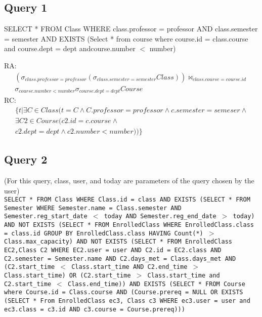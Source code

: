 \documentclass[11pt,oneside,a4paper]{article}
\begin{document}
\subsection{Query 1}
 SELECT * FROM Class WHERE class.professor = professor AND class.semester =
 semester AND EXISTS (Select * from course where course.id = class.course and
 course.dept = dept andcourse.number $<$ number) 

RA: 
\begin{align*}(\sigma_{class.professor = professor} (\sigma_{class.semester = semester}
Class)) \bowtie_{class.course = course.id} \\
\sigma_{course.number < number}
\sigma_{course.dept = dept} Course 
\end{align*}
RC: 
\begin{align*} \{t | \exists C \in Class ( t = C \wedge C.professor = professor \wedge
c.semester = semeser \wedge \\
\exists C2 \in Course ( c2.id = c.course \wedge \\
c2.dept = dept \wedge c2.number < number))\}\end{align*}

\subsection{Query 2}
(For this query, class, user, and today are parameters of the query chosen by
the user) \\

\texttt{SELECT * FROM Class WHERE Class.id = class AND EXISTS (SELECT * FROM
Semester WHERE Semester.name = Class.semester AND Semester.reg\_start\_date $<$
today AND Semester.reg\_end\_date $>$ today) AND NOT EXISTS (SELECT * FROM
EnrolledClass WHERE EnrolledClass.class = class.id GROUP BY EnrolledClass.class
HAVING Count(*) $>$ Class.max\_capacity) AND NOT EXISTS (SELECT * FROM
EnrolledClass EC2,Class C2 WHERE EC2.user = user AND C2.id = EC2.class AND
C2.semester = Semester.name AND C2.days\_met = Class.days\_met AND
(C2.start\_time $<$ Class.start\_time AND C2.end\_time $>$ Class.start\_time)
OR (C2.start\_time $>$ Class.start\_time and C2.start\_time $<$
Class.end\_time)) AND EXISTS (SELECT * FROM Course where Course.id =
Class.course AND (Course.prereq = NULL OR EXISTS (SELECT * From EnrolledClass
ec3, Class c3 WHERE ec3.user = user and ec3.class = c3.id AND c3.course =
Course.prereq)))}
\end{document}
